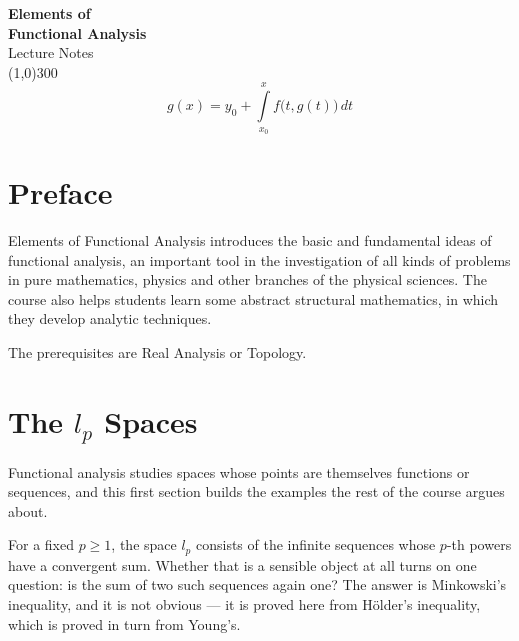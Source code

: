 \documentclass[11pt,a4paper]{article}
\theoremstyle{definition}
\begin{document}
\begin{titlepage}
\begin{center}
\vspace*{3cm}
{\Huge\bfseries Elements of\\[0.35cm] Functional Analysis}\\[1.2cm]
{\large Lecture Notes}\\[2.5cm]
\line(1,0){300}\\[1.5cm]
$$g(x)=y_0+\int\limits^x_{x_0}f\big(t,g(t)\big)\,dt$$
\end{center}
\end{titlepage}

\section*{Preface}
Elements of Functional Analysis introduces the basic and fundamental ideas of
functional analysis, an important tool in the investigation of all kinds of
problems in pure mathematics, physics and other branches of the physical
sciences. The course also helps students learn some abstract structural
mathematics, in which they develop analytic techniques.

The prerequisites are Real Analysis or Topology.

\tableofcontents
\thispagestyle{empty}
\clearpage
\setcounter{page}{1}

\pagebreak

\section{The $l_p$ Spaces}
Functional analysis studies spaces whose points are themselves functions or
sequences, and this first section builds the examples the rest of the course
argues about.

For a fixed $p\geq 1$, the space $l_p$ consists of the infinite sequences whose
$p$-th powers have a convergent sum. Whether that is a sensible object at all
turns on one question: is the sum of two such sequences again one? The answer is
Minkowski's inequality, and it is not obvious --- it is proved here from
H\"older's inequality, which is proved in turn from Young's.
\end{document}
